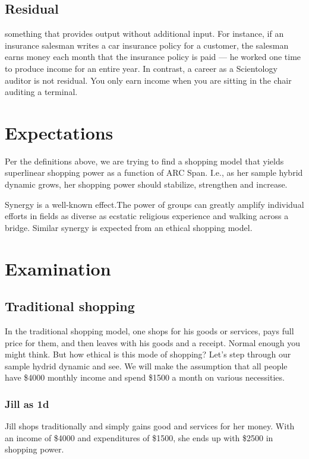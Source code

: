 \documentclass{article}%
\begin{document}
\subsection{Residual}\label{def:residual}
something that provides output without additional input. For instance, if an insurance salesman writes a car insurance policy for a customer, the salesman earns money each month that the insurance policy is paid --- he worked one time to produce income for an entire year. In contrast, a career as a Scientology auditor is not residual. You only earn income when you are sitting in the chair auditing a terminal.

\section{Expectations}

Per the definitions above, we are trying to find a shopping model that yields superlinear shopping power as a function of ARC Span. I.e., as her sample hybrid dynamic grows, her shopping power should stabilize, strengthen and increase.

Synergy is a well-known effect.The power of groups can greatly amplify individual efforts in fields as diverse as ecstatic religious experience and walking across a bridge. Similar synergy is expected from an ethical shopping model.

\section{Examination}
\subsection{Traditional shopping}

In the traditional shopping model, one shops for his goods or services, pays full price for them, and then leaves with his goods and a receipt. Normal enough you might think. But how ethical is this mode of shopping? Let's step through our sample hydrid dynamic and see. We will make the assumption that all people have \$4000 monthly income and spend \$1500 a month on various necessities.

\subsubsection{Jill as 1d}
Jill shops traditionally and simply gains good and services for her money. With an income of \$4000 and expenditures of \$1500, she ends up with \$2500 in shopping power.
\end{document}
